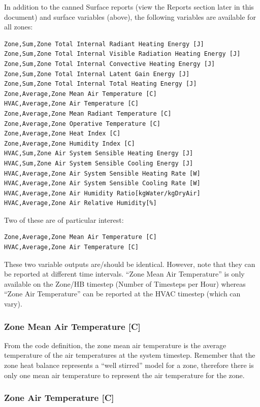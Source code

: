 In addition to the canned Surface reports (view the Reports section later in this document) and surface variables (above), the following variables are available for all zones:

\begin{lstlisting}
Zone,Sum,Zone Total Internal Radiant Heating Energy [J]
Zone,Sum,Zone Total Internal Visible Radiation Heating Energy [J]
Zone,Sum,Zone Total Internal Convective Heating Energy [J]
Zone,Sum,Zone Total Internal Latent Gain Energy [J]
Zone,Sum,Zone Total Internal Total Heating Energy [J]
Zone,Average,Zone Mean Air Temperature [C]
HVAC,Average,Zone Air Temperature [C]
Zone,Average,Zone Mean Radiant Temperature [C]
Zone,Average,Zone Operative Temperature [C]
Zone,Average,Zone Heat Index [C]
Zone,Average,Zone Humidity Index [C]
HVAC,Sum,Zone Air System Sensible Heating Energy [J]
HVAC,Sum,Zone Air System Sensible Cooling Energy [J]
HVAC,Average,Zone Air System Sensible Heating Rate [W]
HVAC,Average,Zone Air System Sensible Cooling Rate [W]
HVAC,Average,Zone Air Humidity Ratio[kgWater/kgDryAir]
HVAC,Average,Zone Air Relative Humidity[%]
\end{lstlisting}

Two of these are of particular interest:

\begin{lstlisting}
Zone,Average,Zone Mean Air Temperature [C]
HVAC,Average,Zone Air Temperature [C]
\end{lstlisting}

These two variable outputs are/should be identical. However, note that they can be reported at different time intervals. ``Zone Mean Air Temperature'' is only available on the Zone/HB timestep (Number of Timesteps per Hour) whereas ``Zone Air Temperature'' can be reported at the HVAC timestep (which can vary).

\subsubsection{Zone Mean Air Temperature {[}C{]}}\label{zone-mean-air-temperature-c-1}

From the code definition, the zone mean air temperature is the average temperature of the air temperatures at the system timestep. Remember that the zone heat balance represents a ``well stirred'' model for a zone, therefore there is only one mean air temperature to represent the air temperature for the zone.

\subsubsection{Zone Air Temperature {[}C{]}}\label{zone-air-temperature-c-1}

